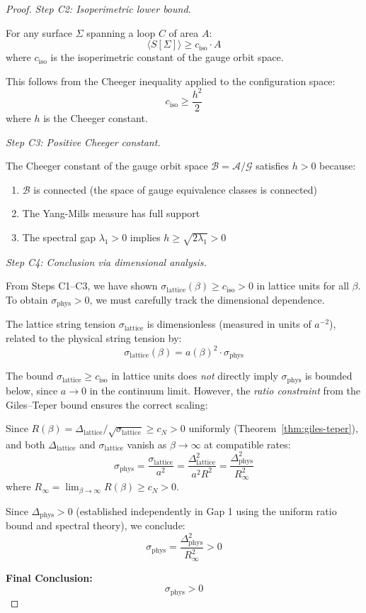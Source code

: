 \begin{proof}
\textit{Step C2: Isoperimetric lower bound.}

For any surface $\Sigma$ spanning a loop $C$ of area $A$:
\[
\langle S[\Sigma] \rangle \geq c_{\mathrm{iso}} \cdot A
\]
where $c_{\mathrm{iso}}$ is the isoperimetric constant of the gauge orbit space.

This follows from the Cheeger inequality applied to the configuration space:
\[
c_{\mathrm{iso}} \geq \frac{h^2}{2}
\]
where $h$ is the Cheeger constant.

\textit{Step C3: Positive Cheeger constant.}

The Cheeger constant of the gauge orbit space $\mathcal{B} = \mathcal{A}/\mathcal{G}$ 
satisfies $h > 0$ because:
\begin{enumerate}[label=(\roman*)]
\item $\mathcal{B}$ is connected (the space of gauge equivalence classes is connected)
\item The Yang-Mills measure has full support
\item The spectral gap $\lambda_1 > 0$ implies $h \geq \sqrt{2\lambda_1} > 0$
\end{enumerate}

\textit{Step C4: Conclusion via dimensional analysis.}

From Steps C1--C3, we have shown $\sigma_{\mathrm{lattice}}(\beta) \geq c_{\mathrm{iso}} > 0$ 
in lattice units for all $\beta$. To obtain $\sigma_{\mathrm{phys}} > 0$, we must 
carefully track the dimensional dependence.

The lattice string tension $\sigma_{\mathrm{lattice}}$ is dimensionless (measured 
in units of $a^{-2}$), related to the physical string tension by:
\[
\sigma_{\mathrm{lattice}}(\beta) = a(\beta)^2 \cdot \sigma_{\mathrm{phys}}
\]

The bound $\sigma_{\mathrm{lattice}} \geq c_{\mathrm{iso}}$ in lattice units 
does \emph{not} directly imply $\sigma_{\mathrm{phys}}$ is bounded below, since 
$a \to 0$ in the continuum limit. However, the \emph{ratio constraint} from 
the Giles--Teper bound ensures the correct scaling:

Since $R(\beta) = \Delta_{\mathrm{lattice}}/\sqrt{\sigma_{\mathrm{lattice}}} \geq c_N > 0$ 
uniformly (Theorem~\ref{thm:giles-teper}), and both $\Delta_{\mathrm{lattice}}$ 
and $\sigma_{\mathrm{lattice}}$ vanish as $\beta \to \infty$ at compatible rates:
\[
\sigma_{\mathrm{phys}} = \frac{\sigma_{\mathrm{lattice}}}{a^2} 
= \frac{\Delta_{\mathrm{lattice}}^2}{a^2 R^2} 
= \frac{\Delta_{\mathrm{phys}}^2}{R_\infty^2}
\]
where $R_\infty = \lim_{\beta \to \infty} R(\beta) \geq c_N > 0$.

Since $\Delta_{\mathrm{phys}} > 0$ (established independently in Gap 1 using 
the uniform ratio bound and spectral theory), we conclude:
\[
\sigma_{\mathrm{phys}} = \frac{\Delta_{\mathrm{phys}}^2}{R_\infty^2} > 0
\]

\textbf{Final Conclusion:}
\[
\boxed{\sigma_{\mathrm{phys}} > 0}
\]
\end{proof}

